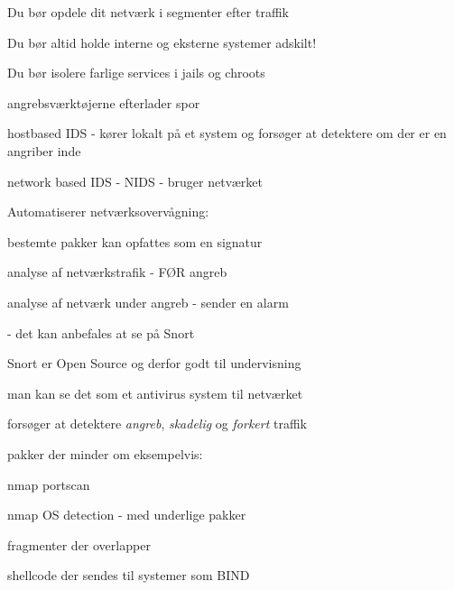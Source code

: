 \documentclass[Screen16to9,17pt]{foils}
\begin{document}


\begin{list1}
\item Du bør opdele dit netværk i segmenter efter traffik
\item Du bør altid holde interne og eksterne systemer adskilt!
\item Du bør isolere farlige services i jails og chroots
\end{list1}




\begin{list1}
  \item angrebsværktøjerne efterlader spor

\item hostbased IDS - kører lokalt på et system og forsøger at
  detektere om der er en angriber inde
\item network based IDS - NIDS - bruger netværket
\item Automatiserer netværksovervågning:
  \begin{list2}
  \item bestemte pakker kan opfattes som en signatur
\item analyse af netværkstrafik - FØR angreb
\item analyse af netværk under angreb - sender en alarm
  \end{list2}
\item {} - det kan anbefales at se på Snort
\end{list1}



\begin{list1}
\item Snort er Open Source og derfor godt til undervisning
\item man kan se det som et antivirus system til netværket
\item forsøger at detektere \emph{angreb}, \emph{skadelig} og
  \emph{forkert} traffik
\item pakker der minder om eksempelvis:
  \begin{list2}
    \item nmap portscan
\item nmap OS detection - med underlige pakker
\item fragmenter der overlapper
\item shellcode der sendes til systemer som BIND
  \end{list2}
\end{list1}
\end{document}

